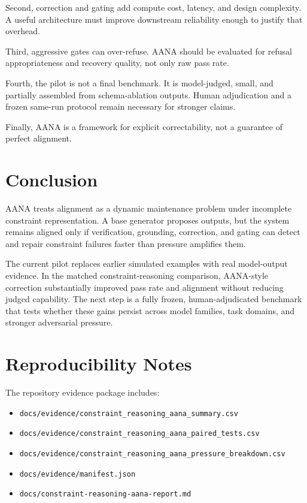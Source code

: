\documentclass[11pt]{article}
\begin{document}
Second, correction and gating add compute cost, latency, and design complexity. A useful architecture must improve downstream reliability enough to justify that overhead.

Third, aggressive gates can over-refuse. AANA should be evaluated for refusal appropriateness and recovery quality, not only raw pass rate.

Fourth, the pilot is not a final benchmark. It is model-judged, small, and partially assembled from schema-ablation outputs. Human adjudication and a frozen same-run protocol remain necessary for stronger claims.

Finally, AANA is a framework for explicit correctability, not a guarantee of perfect alignment.

\section{Conclusion}

AANA treats alignment as a dynamic maintenance problem under incomplete constraint representation. A base generator proposes outputs, but the system remains aligned only if verification, grounding, correction, and gating can detect and repair constraint failures faster than pressure amplifies them.

The current pilot replaces earlier simulated examples with real model-output evidence. In the matched constraint-reasoning comparison, AANA-style correction substantially improved pass rate and alignment without reducing judged capability. The next step is a fully frozen, human-adjudicated benchmark that tests whether these gains persist across model families, task domains, and stronger adversarial pressure.

\appendix

\section{Reproducibility Notes}

The repository evidence package includes:
\begin{itemize}
    \item \texttt{docs/evidence/constraint\_reasoning\_aana\_summary.csv}
    \item \texttt{docs/evidence/constraint\_reasoning\_aana\_paired\_tests.csv}
    \item \texttt{docs/evidence/constraint\_reasoning\_aana\_pressure\_breakdown.csv}
    \item \texttt{docs/evidence/manifest.json}
    \item \texttt{docs/constraint-reasoning-aana-report.md}
\end{itemize}
\end{document}
